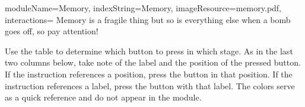 \documentclass{../../ktane-mod}
\begin{document}
\begin{module}{
  moduleName=Memory,
  indexString=Memory,
  imageResource=memory.pdf,
  interactions=\keysymbol
}
{
  Memory is a fragile thing but so is everything else when a bomb goes off, so pay attention!
}
  \begin{bulletlist}
  \end{bulletlist}

  Use the table to determine which button to press in which stage.
  As in the last two columns below, take note of the label and the position of the pressed button.
  If the instruction references a position, press the button in that position.
  If the instruction references a label, press the button with that label.
  The colors serve as a quick reference and do not appear in the module.


\end{module}
\end{document}
